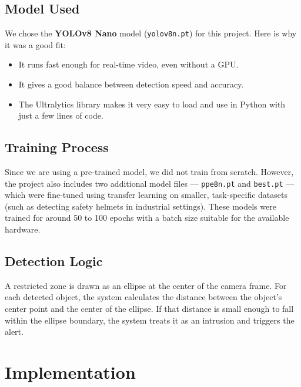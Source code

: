 \documentclass[12pt,a4paper]{article}
\begin{document}
\subsection{Model Used}
We chose the \textbf{YOLOv8 Nano} model (\texttt{yolov8n.pt}) for this project. Here is why it was a good fit:
\begin{itemize}
    \item It runs fast enough for real-time video, even without a GPU.
    \item It gives a good balance between detection speed and accuracy.
    \item The Ultralytics library makes it very easy to load and use in Python with just a few lines of code.
\end{itemize}

\subsection{Training Process}
Since we are using a pre-trained model, we did not train from scratch. However, the project also includes two additional model files --- \texttt{ppe8n.pt} and \texttt{best.pt} --- which were fine-tuned using transfer learning on smaller, task-specific datasets (such as detecting safety helmets in industrial settings). These models were trained for around 50 to 100 epochs with a batch size suitable for the available hardware.

\subsection{Detection Logic}
A restricted zone is drawn as an ellipse at the center of the camera frame. For each detected object, the system calculates the distance between the object's center point and the center of the ellipse. If that distance is small enough to fall within the ellipse boundary, the system treats it as an intrusion and triggers the alert. 

\section{Implementation}
\end{document}
